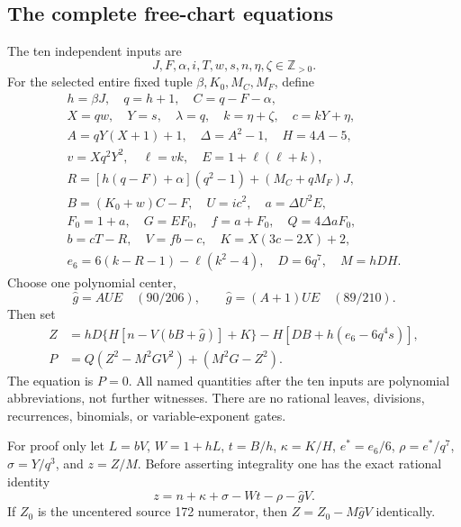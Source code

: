 \subsection{The complete free-chart equations}
The ten independent inputs are
\[
 J,F,\alpha,i,T,w,s,n,\eta,\zeta\in\mathbb Z_{>0}.
\]
For the selected entire fixed tuple $\beta,K_0,M_C,M_F$, define
\[
\begin{gathered}
 h=\beta J,\quad q=h+1,\quad C=q-F-\alpha,\\
 X=qw,\quad Y=s,\quad\lambda=q,\quad k=\eta+\zeta,\quad c=kY+\eta,\\
 A=qY(X+1)+1,\quad\Delta=A^2-1,\quad H=4A-5,\\
 v=Xq^2Y^2,\quad\ell=vk,\quad E=1+\ell(\ell+k),\\
 R=[h(q-F)+\alpha](q^2-1)+(M_C+qM_F)J,\\
 B=(K_0+w)C-F,\quad U=ic^2,\quad a=\Delta U^2E,\\
 F_0=1+a,\quad G=EF_0,\quad f=a+F_0,\quad Q=4\Delta aF_0,\\
 b=cT-R,\quad V=fb-c,\quad K=X(3c-2X)+2,\\
 e_6=6(k-R-1)-\ell(k^2-4),\quad D=6q^7,\quad M=hDH.
\end{gathered}
\]
Choose one polynomial center,
\[
 \widehat g=AUE\quad(90/206),\qquad
 \widehat g=(A+1)UE\quad(89/210).
\]
Then set
\begin{align}
 Z&=hD\{H[n-V(bB+\widehat g)]+K\}-H[DB+h(e_6-6q^4s)],\label{eq:freeZ}\\
 P&=Q(Z^2-M^2GV^2)+(M^2G-Z^2).\label{eq:freeP}
\end{align}
The equation is $P=0$. All named quantities after the ten inputs are
polynomial abbreviations, not further witnesses. There are no rational
leaves, divisions, recurrences, binomials, or variable-exponent gates.

For proof only let $L=bV$, $W=1+hL$, $t=B/h$, $\kappa=K/H$,
$e^*=e_6/6$, $\rho=e^*/q^7$, $\sigma=Y/q^3$, and $z=Z/M$.
Before asserting integrality one has the exact rational identity
\begin{equation}
 z=n+\kappa+\sigma-Wt-\rho-\widehat gV.\label{eq:freecarrier}
\end{equation}
If $Z_0$ is the uncentered source 172 numerator, then
$Z=Z_0-M\widehat gV$ identically.

